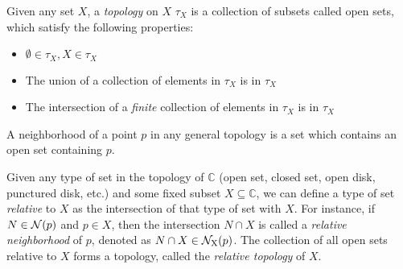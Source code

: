 \documentclass{refbook}
\begin{document}
\begin{definition}
Given any set $X$, a \emph{topology} on $X$ $\tau_X$ is a collection of subsets called open sets, which satisfy the following properties:
\begin{itemize}
\item $\emptyset \in \tau_X, X \in \tau_X$
\item The union of a collection of elements in $\tau_X$ is in $\tau_X$
\item The intersection of a \emph{finite} collection of elements in $\tau_X$ is in $\tau_X$
\end{itemize}
A neighborhood of a point $p$ in any general topology is a set which contains an open set containing $p$.
\end{definition}
\begin{definition}
Given any type of set in the topology of $\mathbb{C}$ (open set, closed set, open disk, punctured disk, etc.) and some fixed subset $X \subseteq \mathbb{C}$, we can define a type of set \emph{relative} to $X$ as the intersection of that type of set with $X$. For instance, if $N \in \nbhd{p}$ and $p \in X$, then the intersection $N \cap X$ is called a \emph{relative neighborhood} of $p$, denoted as $N \cap X \in \rnbhd{p}{X}$. The collection of all open sets relative to $X$ forms a topology, called the \emph{relative topology} of $X$.
\end{definition}
\end{document}
